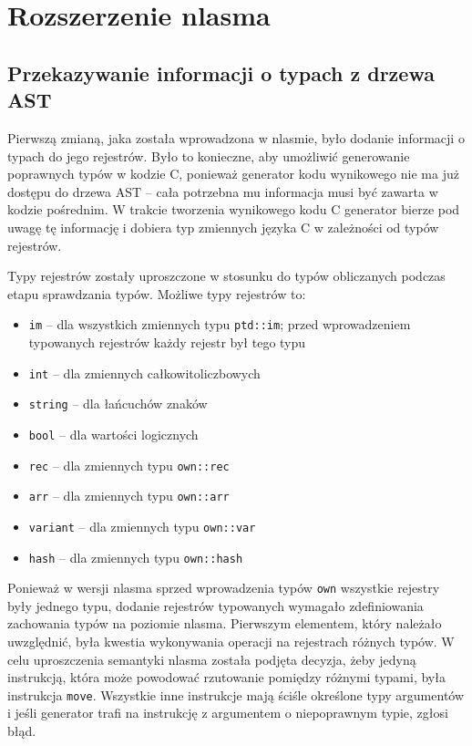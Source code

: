 \documentclass[licencjacka]{pracamgr}
\begin{document}
\chapter{Rozszerzenie nlasma}
\section{Przekazywanie informacji o typach z drzewa AST}
Pierwszą zmianą, jaka została wprowadzona w nlasmie, było dodanie informacji o typach do jego rejestrów.
Było to konieczne, aby umożliwić generowanie poprawnych typów w kodzie C, ponieważ generator kodu wynikowego
nie ma już dostępu do drzewa AST -- cała potrzebna mu informacja musi być zawarta w kodzie pośrednim.
W trakcie tworzenia wynikowego kodu C generator bierze pod uwagę tę informację i dobiera typ zmiennych języka C
w zależności od typów rejestrów.

Typy rejestrów zostały uproszczone w stosunku do typów obliczanych podczas etapu sprawdzania typów.
Możliwe typy rejestrów to:
\begin{itemize}
 \item \texttt{im} -- dla wszystkich zmiennych typu \texttt{ptd::im}; przed wprowadzeniem typowanych rejestrów
 każdy rejestr był tego typu
 \item \texttt{int} -- dla zmiennych całkowitoliczbowych
 \item \texttt{string} -- dla łańcuchów znaków
 \item \texttt{bool} -- dla wartości logicznych
 \item \texttt{rec} -- dla zmiennych typu \texttt{own::rec}
 \item \texttt{arr} -- dla zmiennych typu \texttt{own::arr}
 \item \texttt{variant} -- dla zmiennych typu \texttt{own::var}
 \item \texttt{hash} -- dla zmiennych typu \texttt{own::hash}
\end{itemize}


Ponieważ w wersji nlasma sprzed wprowadzenia typów \texttt{own} wszystkie rejestry były jednego typu,
dodanie rejestrów typowanych wymagało zdefiniowania zachowania typów na poziomie nlasma.
Pierwszym elementem, który należało uwzględnić, była kwestia wykonywania operacji na rejestrach różnych typów.
W celu uproszczenia semantyki nlasma została podjęta decyzja, żeby jedyną instrukcją, która może powodować
rzutowanie pomiędzy różnymi typami, była instrukcja \texttt{move}.
Wszystkie inne instrukcje mają ściśle określone typy argumentów i jeśli generator trafi na instrukcję z argumentem
o niepoprawnym typie, zgłosi błąd.
\end{document}
